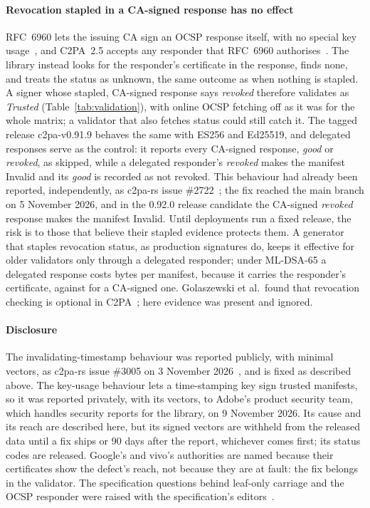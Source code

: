 \paragraph{Revocation stapled in a CA-signed response has no effect}
RFC~6960 lets the issuing CA sign an OCSP response itself, with no special key
usage~\cite{rfc6960}, and C2PA~2.5 accepts any responder that RFC~6960
authorises~\cite{c2pa25}. The library instead looks for the responder's
certificate in the response, finds none, and treats the status as unknown, the
same outcome as when nothing is stapled. A signer whose stapled, CA-signed
response says \emph{revoked} therefore validates as \emph{Trusted}
(Table~\ref{tab:validation}), with online OCSP fetching off as it was for the
whole matrix; a validator that also fetches status could still catch it. The
tagged release c2pa-v0.91.9 behaves the same with ES256 and Ed25519, and
delegated responses serve as the control: it reports every CA-signed response,
\emph{good} or \emph{revoked}, as skipped, while a delegated responder's
\emph{revoked} makes the manifest Invalid and its \emph{good} is recorded as
not revoked. This behaviour had already been reported, independently, as
c2pa-rs issue \#2722~\cite{c2pars2722}; the fix reached the main branch on
5 November 2026, and in the 0.92.0 release candidate the CA-signed
\emph{revoked} response makes the manifest Invalid. Until deployments run a
fixed release, the risk is to those that believe their stapled evidence
protects them. A generator that staples revocation status, as
\NcorpProdOcsp{} production signatures do, keeps it effective for older
validators only through a delegated responder; under ML-DSA-65 a delegated
response costs \NocspDelDSAsixtyfive{} bytes per manifest, because it carries
the responder's certificate, against \NocspCADSAsixtyfive{} for a CA-signed
one. Golaszewski et al.\ found that revocation checking is optional in
C2PA~\cite{golaszewski2026}; here evidence was present and ignored.

\paragraph{Disclosure}
The invalidating-timestamp behaviour was reported publicly, with minimal
vectors, as c2pa-rs issue \#3005 on 3 November 2026~\cite{c2pars3005}, and is
fixed as described above. The key-usage behaviour lets a time-stamping key sign
trusted manifests, so it was reported privately, with its vectors, to Adobe's
product security team, which handles security reports for the library, on
9 November 2026. Its cause and its reach are described here, but its signed
vectors are withheld from the released data until a fix ships or 90 days after
the report, whichever comes first; its status codes are released. Google's and
vivo's authorities are named because their certificates show the defect's
reach, not because they are at fault: the fix belongs in the validator. The
specification questions behind leaf-only carriage and the OCSP responder were
raised with the specification's editors~\cite{c2paspec142,c2paspec143}.

